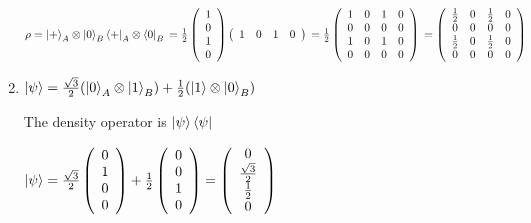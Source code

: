 \documentclass{article}
\begin{document}
\begin{enumerate}
          $\rho
              \\=\ket{+}_A\otimes\ket{0}_B\bra{+}_A\otimes\bra{0}_B
              \\=\frac{1}{2}\left(\begin{array}{c}
                      1 \\0\\1\\0
                  \end{array}\right)\left(\begin{array}{cccc}
                      1 & 0 & 1 & 0
                  \end{array}\right)
              \\=\frac{1}{2}\left(
              \begin{array}{cccc}
                      1 & 0 & 1 & 0 \\0&0&0&0\\1&0&1&0\\0&0&0&0
                  \end{array}
              \right)
              \\=\left(
              \begin{array}{cccc}
                      \frac{1}{2} & 0 & \frac{1}{2} & 0 \\0&0&0&0\\\frac{1}{2}&0&\frac{1}{2}&0\\0&0&0&0
                  \end{array}
              \right)
          $
    \item $\ket{\psi}=\frac{\sqrt{3}}{2}(\ket{0}_A\otimes\ket{1}_B)+\frac{1}{2}(\ket{1}\otimes\ket{0}_B)$

          The density operator is $\ket{\psi}\bra{\psi}$

          $\ket{\psi}=\frac{\sqrt{3}}{2}\left(\begin{array}{c}
                      0 \\1\\0\\0
                  \end{array}\right)+\frac{1}{2}\left(\begin{array}{c}
                      0 \\0\\1\\0
                  \end{array}\right)=\left(\begin{array}{c}
                      0 \\\frac{\sqrt{3}}{2}\\\frac{1}{2}\\0
                  \end{array}\right)$


\end{enumerate}
\end{document}
